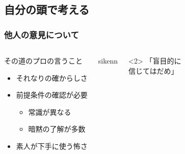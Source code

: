 \documentclass[12pt, dvipdfmx]{beamer}
\begin{document}
\subsection{自分の頭で考える}
\begin{frame}
    \frametitle{他人の意見について}
        \begin{columns}[c, onlytextwidth]
            \large
            \begin{block}{その道のプロの言うこと}
                \begin{itemize}
                    \large
                    \item それなりの確からしさ
                    \item 前提条件の確認が必要
                    \begin{itemize}
                        \large
                        \item 常識が異なる
                        \item 暗黙の了解が多数
                    \end{itemize}
                    \item 素人が下手に使う怖さ
                \end{itemize}
            \end{block}

            sikenn

            
            <2>
            \LARGE
                \alert{「盲目的に\\信じてはだめ」}
        \end{columns}
\end{frame}
\end{document}
